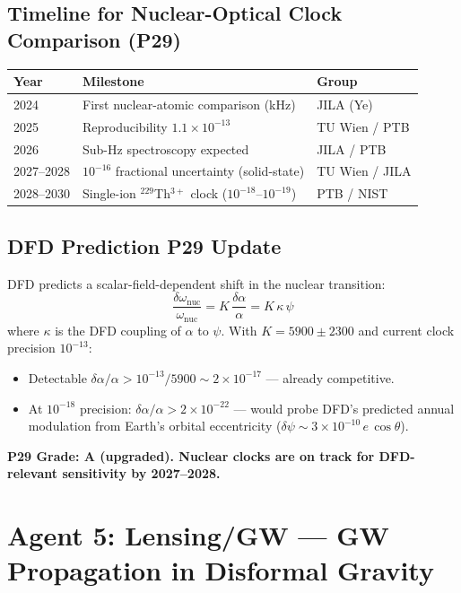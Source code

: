 \documentclass[11pt,a4paper]{article}
\begin{document}
\subsection{Timeline for Nuclear-Optical Clock Comparison (P29)}

\begin{center}
\begin{tabular}{lll}
\toprule
\textbf{Year} & \textbf{Milestone} & \textbf{Group} \\
\midrule
2024 & First nuclear-atomic comparison (kHz) & JILA (Ye) \\
2025 & Reproducibility $1.1\times10^{-13}$ & TU Wien / PTB \\
2026 & Sub-Hz spectroscopy expected & JILA / PTB \\
2027--2028 & $10^{-16}$ fractional uncertainty (solid-state) & TU Wien / JILA \\
2028--2030 & Single-ion $^{229}$Th$^{3+}$ clock ($10^{-18}$--$10^{-19}$) & PTB / NIST \\
\bottomrule
\end{tabular}
\end{center}

\subsection{DFD Prediction P29 Update}
DFD predicts a scalar-field-dependent shift in the nuclear transition:
\begin{equation}
\frac{\delta\omega_\mathrm{nuc}}{\omega_\mathrm{nuc}} = K\,\frac{\delta\alpha}{\alpha} = K\,\kappa\,\psi
\end{equation}
where $\kappa$ is the DFD coupling of $\alpha$ to $\psi$. With $K = 5900 \pm 2300$ and current clock precision $10^{-13}$:
\begin{itemize}
\item Detectable $\delta\alpha/\alpha > 10^{-13}/5900 \sim 2\times10^{-17}$ --- already competitive.
\item At $10^{-18}$ precision: $\delta\alpha/\alpha > 2\times10^{-22}$ --- would probe DFD's predicted annual modulation from Earth's orbital eccentricity ($\delta\psi \sim 3\times10^{-10}\,e\,\cos\theta$).
\end{itemize}

\textbf{P29 Grade: A (upgraded). Nuclear clocks are on track for DFD-relevant sensitivity by 2027--2028.}

\section{Agent 5: Lensing/GW --- GW Propagation in Disformal Gravity}
\end{document}
